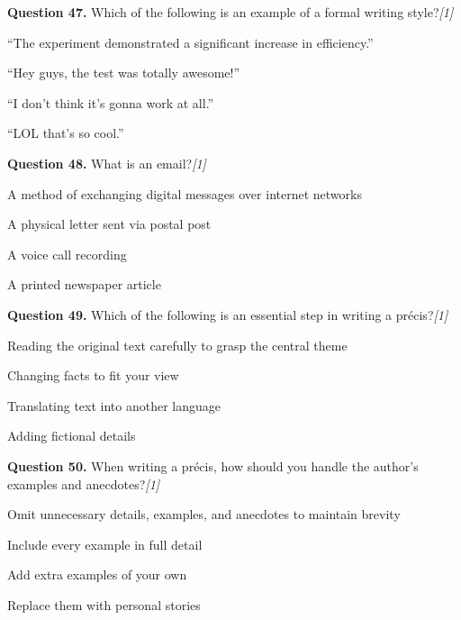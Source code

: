 \documentclass[11pt,a4paper]{article}
\newcommand{\pts}[1]{\hfill   \textit{[#1]}}
\begin{document}
\medskip




\noindent   \textbf{Question 47.} Which of the following is an example of a formal writing style?\pts{1}

\begin{parts}
  \item ``The experiment demonstrated a significant increase in efficiency.''
  \item ``Hey guys, the test was totally awesome!''
  \item ``I don't think it's gonna work at all.''
  \item ``LOL that's so cool.''
\end{parts}

\medskip




\noindent   \textbf{Question 48.} What is an email?\pts{1}

\begin{parts}
  \item A method of exchanging digital messages over internet networks
  \item A physical letter sent via postal post
  \item A voice call recording
  \item A printed newspaper article
\end{parts}

\medskip




\noindent   \textbf{Question 49.} Which of the following is an essential step in writing a précis?\pts{1}

\begin{parts}
  \item Reading the original text carefully to grasp the central theme
  \item Changing facts to fit your view
  \item Translating text into another language
  \item Adding fictional details
\end{parts}

\medskip




\noindent   \textbf{Question 50.} When writing a précis, how should you handle the author's examples and anecdotes?\pts{1}

\begin{parts}
  \item Omit unnecessary details, examples, and anecdotes to maintain brevity
  \item Include every example in full detail
  \item Add extra examples of your own
  \item Replace them with personal stories
\end{parts}
\end{document}
